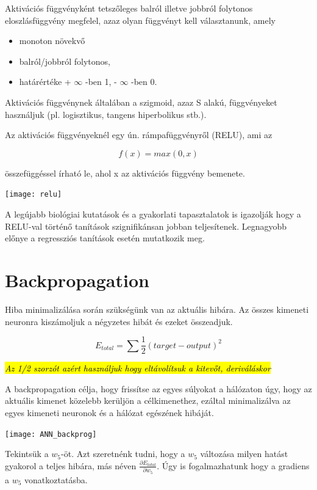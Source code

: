 Aktivációs függvényként tetszőleges balról illetve jobbról folytonos eloszlásfüggvény megfelel, azaz olyan függvényt kell választanunk, amely

\begin{itemize}
\item monoton növekvő
\item balról/jobbról folytonos,
\item határértéke + $\infty$ -ben 1, - $\infty$ -ben 0.
\end{itemize}

Aktivációs függvénynek általában a szigmoid, azaz S alakú, függvényeket használjuk (pl. logisztikus, tangens hiperbolikus stb.).

Az aktivációs függvényeknél egy ún. rámpafüggvényről (RELU), ami az

\[ f(x) = max(0,x) \]

összefüggéssel írható le, ahol x az aktivációs függvény bemenete.

\begin{center}
\texttt{[image: relu]}
\end{center}

A legújabb biológiai kutatások és a gyakorlati tapasztalatok is igazolják hogy a RELU-val történő tanítások szignifikánsan jobban teljesítenek. Legnagyobb előnye a regressziós tanítások esetén mutatkozik meg.

\section{Backpropagation}

Hiba minimalizálása során szükségünk van az aktuális hibára. Az összes kimeneti neuronra kiszámoljuk a négyzetes hibát és ezeket összeadjuk.

\[ E_{total} = \sum \dfrac{1}{2}(target - output)^2\]

\textit{\hl{Az 1/2 szorzót azért használjuk hogy eltávolítsuk a kitevőt, deriváláskor}
}

A backpropagation célja, hogy frissítse az egyes súlyokat a hálózaton úgy, hogy az aktuális kimenet közelebb kerüljön a célkimenethez, ezáltal minimalizálva az egyes kimeneti neuronok és a hálózat egészének hibáját.

\begin{center}
\texttt{[image: ANN\_backprog]}
\end{center}

Tekintsük a \(w_5\)-öt. Azt szeretnénk tudni, hogy a \(w_5\) változása milyen hatást gyakorol a teljes hibára, más néven $\frac{\partial E_ {total}}{\partial w_ {5}}$. Úgy is fogalmazhatunk hogy a gradiens a \(w_5\) vonatkoztatásba.


